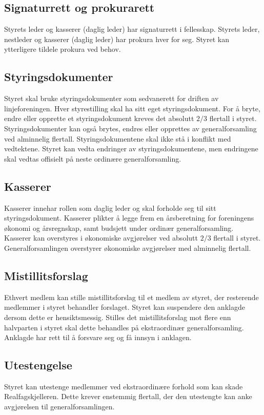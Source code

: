 \subsection{Signaturrett og prokurarett} \label{signaturrett og prokurarett}

Styrets leder og kasserer (daglig leder) har signaturrett i fellesskap.
Styrets leder, nestleder og kasserer (daglig leder) har prokura hver for seg.
Styret kan ytterligere tildele prokura ved behov.

\subsection{Styringsdokumenter} \label{styringsdokumenter}

Styret skal bruke styringsdokumenter som sedvanerett for driften av linjeforeningen.
Hver styrestilling skal ha sitt eget styringsdokument.
For å bryte, endre eller opprette et styringsdokument kreves det absolutt $2/3$ flertall i styret.
Styringsdokumenter kan også brytes, endres eller opprettes av generalforsamling ved alminnelig flertall. 
Styringsdokumentene skal ikke stå i konflikt med vedtektene.
Styret kan vedta endringer av styringsdokumentene, men endringene skal vedtas offisielt på neste ordinære generalforsamling.

\subsection{Kasserer} \label{kasserer}

Kasserer innehar rollen som daglig leder og skal forholde seg til sitt styringsdokument.
Kasserer plikter å legge frem en årsberetning for foreningens økonomi og årsregnskap, samt budsjett under ordinær generalforsamling.
Kasserer kan overstyres i økonomiske avgjørelser ved absolutt $2/3$ flertall i styret. 
Generalforsamlingen overstyrer økonomiske avgjørelser med alminnelig flertall.

\subsection{Mistillitsforslag} \label{mistillitsforslag}

Ethvert medlem kan stille mistillitsforslag til et medlem av styret, der resterende medlemmer i styret behandler forslaget.
Styret kan suspendere den anklagde dersom dette er hensiktsmessig.
Stilles det mistillitsforslag mot flere enn halvparten i styret skal dette behandles på ekstraordinær generalforsamling.
Anklagde har rett til å forsvare seg og få innsyn i anklagen.

\subsection{Utestengelse} \label{utestengelse}

Styret kan utestenge medlemmer ved ekstraordinære forhold som kan skade Realfagskjelleren.
Dette krever enstemmig flertall, der den utestengte kan anke avgjørelsen til generalforsamlingen.